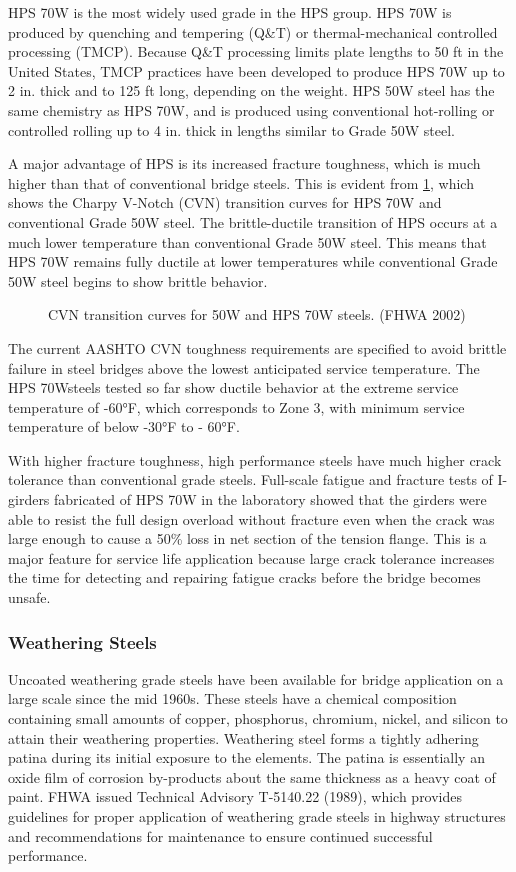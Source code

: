 HPS 70W is the most widely used grade in the HPS group. HPS 70W is produced by quenching and tempering (Q\&T) or thermal-mechanical controlled processing (TMCP). Because Q\&T processing limits plate lengths to 50 ft in the United States, TMCP practices have been developed to produce HPS 70W up to 2 in. thick and to 125 ft long, depending on the weight. HPS 50W steel has the same chemistry as HPS 70W, and is produced using conventional hot-rolling or controlled rolling up to 4 in. thick in lengths similar to Grade 50W steel.

A major advantage of HPS is its increased fracture toughness, which is much higher than that of conventional bridge steels. This is evident from \cref{fig:transition-curves-steel}, which shows the Charpy V-Notch (CVN) transition curves for HPS 70W and conventional Grade 50W steel. The brittle-ductile transition of HPS occurs at a much lower temperature than conventional Grade 50W steel. This means that HPS 70W remains fully ductile at lower temperatures while conventional Grade 50W steel begins to show brittle behavior.

\begin{figure}
  \caption{CVN transition curves for 50W and HPS 70W steels. (FHWA 2002)}\label{fig:transition-curves-steel}
\end{figure}

The current AASHTO CVN toughness requirements are specified to avoid brittle failure in steel bridges above
the lowest anticipated service temperature. The HPS 70Wsteels tested so far show ductile behavior at the extreme
service temperature of -60°F, which corresponds to Zone 3, with minimum service temperature of below -30°F to -
60°F.

With higher fracture toughness, high performance steels have much higher crack tolerance than conventional
grade steels. Full-scale fatigue and fracture tests of I-girders fabricated of HPS 70W in the laboratory showed that the
girders were able to resist the full design overload without fracture even when the crack was large enough to cause a
50\% loss in net section of the tension flange. This is a major feature for service life application because large crack
tolerance increases the time for detecting and repairing fatigue cracks before the bridge becomes unsafe.

\subsubsection{Weathering Steels}
Uncoated weathering grade steels have been available for bridge application on a large scale since the mid 1960s.
These steels have a chemical composition containing small amounts of copper, phosphorus, chromium, nickel, and
silicon to attain their weathering properties. Weathering steel forms a tightly adhering patina during its initial
exposure to the elements. The patina is essentially an oxide film of corrosion by-products about the same thickness as
a heavy coat of paint. FHWA issued Technical Advisory T-5140.22 (1989), which provides guidelines for proper
application of weathering grade steels in highway structures and recommendations for maintenance to ensure
continued successful performance.

